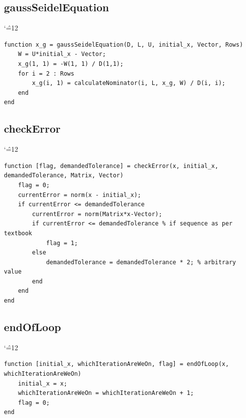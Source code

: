 \documentclass[12pt]{report}
\newenvironment{simplechar}{%
   \catcode`\^=12
}{}
\begin{document}
\subsection{gaussSeidelEquation}
\begin{simplechar}
\begin{lstlisting}
function x_g = gaussSeidelEquation(D, L, U, initial_x, Vector, Rows)
    W = U*initial_x - Vector;
    x_g(1, 1) = -W(1, 1) / D(1,1);
    for i = 2 : Rows
        x_g(i, 1) = calculateNominator(i, L, x_g, W) / D(i, i);
    end
end
\end{lstlisting}
\end{simplechar}

\subsection{checkError}
\begin{simplechar}
\begin{lstlisting}
function [flag, demandedTolerance] = checkError(x, initial_x, demandedTolerance, Matrix, Vector)
    flag = 0;
    currentError = norm(x - initial_x);
    if currentError <= demandedTolerance
        currentError = norm(Matrix*x-Vector);
        if currentError <= demandedTolerance % if sequence as per textbook
            flag = 1;
        else
            demandedTolerance = demandedTolerance * 2; % arbitrary value
        end
    end
end
\end{lstlisting}
\end{simplechar}

\subsection{endOfLoop}
\begin{simplechar}
\begin{lstlisting}
function [initial_x, whichIterationAreWeOn, flag] = endOfLoop(x, whichIterationAreWeOn)
    initial_x = x;
    whichIterationAreWeOn = whichIterationAreWeOn + 1;
    flag = 0;
end
\end{lstlisting}
\end{simplechar}
\end{document}
